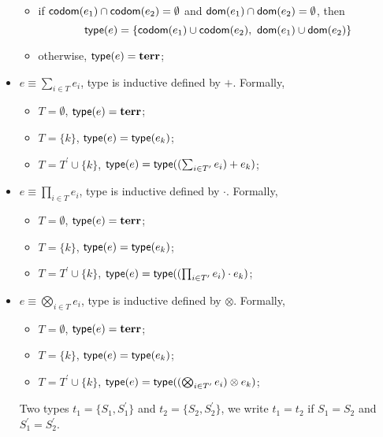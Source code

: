\begin{definition}
\begin{itemize}
\begin{itemize}
                \item if ${\mathsf{codom}\!\left(e_1\right)}\cap {\mathsf{codom}\!\left(e_2\right)} = \emptyset$ and ${\mathsf{dom}\!\left(e_1\right)}\cap {\mathsf{dom}\!\left(e_2\right)} = \emptyset$, then 
                $${\textsf{type}}(e) = \{{\mathsf{codom}\!\left(e_1\right)}\cup {\mathsf{codom}\!\left(e_2\right)},\  {\mathsf{dom}\!\left(e_1\right)}\cup {\mathsf{dom}\!\left(e_2\right)}\}$$
                \item otherwise, ${\textsf{type}}(e) = {\mathbf{terr}}$;
            \end{itemize}
            \item $e\equiv\sum_{i\in T} e_i$,  type is inductive defined by $+$. Formally,
            \begin{itemize}
                \item $T = \emptyset$, ${\textsf{type}}(e) = {\mathbf{terr}}$;
                \item $T = \{k\}$, ${\textsf{type}}(e) = {\textsf{type}}(e_k)$;
                \item $T = T^\prime\cup\{k\}$, ${\textsf{type}}(e) = {\textsf{type}}((\sum_{i\in T^\prime}e_i) + e_k)$;
            \end{itemize}
            \item $e\equiv\prod_{i\in T} e_i$,  type is inductive defined by $\cdot$. Formally,
            \begin{itemize}
                \item $T = \emptyset$, ${\textsf{type}}(e) = {\mathbf{terr}}$;
                \item $T = \{k\}$, ${\textsf{type}}(e) = {\textsf{type}}(e_k)$;
                \item $T = T^\prime\cup\{k\}$, ${\textsf{type}}(e) = {\textsf{type}}((\prod_{i\in T^\prime}e_i) \cdot e_k)$;
            \end{itemize}
            \item $e\equiv\bigotimes_{i\in T} e_i$,  type is inductive defined by $\otimes$. Formally,
            \begin{itemize}
                \item $T = \emptyset$, ${\textsf{type}}(e) = {\mathbf{terr}}$;
                \item $T = \{k\}$, ${\textsf{type}}(e) = {\textsf{type}}(e_k)$;
                \item $T = T^\prime\cup\{k\}$, ${\textsf{type}}(e) = {\textsf{type}}((\bigotimes_{i\in T^\prime}e_i) \otimes e_k)$;
            \end{itemize}
            Two types $t_1=\{S_1,S_1^\prime\}$ and $t_2=\{S_2,S_2^\prime\}$, we write $t_1 = t_2$ if $S_1 = S_2$ and $S_1^\prime = S_2^\prime$.
        \end{itemize}
        
    \end{definition}
    
